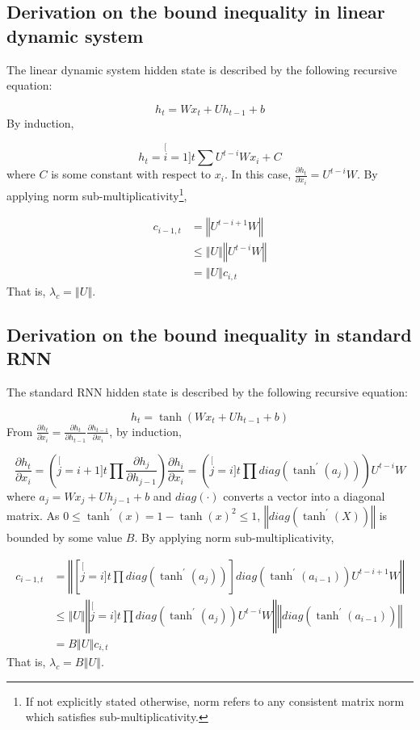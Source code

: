 
\subsection{Derivation on the bound inequality in linear dynamic system\label{subsec:Derivation-on-theRNN}}

The linear dynamic system hidden state is described by the following
recursive equation:

\[
h_{t}=Wx_{t}+Uh_{t-1}+b
\]
By induction,

\[
h_{t}=\stackrel[i=1]{t}{\sum}U^{t-i}Wx_{i}+C
\]
where $C$ is some constant with respect to $x_{i}$. In this case,
$\frac{\partial h_{t}}{\partial x_{i}}=U^{t-i}W$. By applying norm
sub-multiplicativity\footnote{If not explicitly stated otherwise, norm refers to any consistent
matrix norm which satisfies sub-multiplicativity. }, 

\begin{align*}
c_{i-1,t} & =\left\Vert U^{t-i+1}W\right\Vert \\
 & \leq\left\Vert U\right\Vert \left\Vert U^{t-i}W\right\Vert \\
 & =\left\Vert U\right\Vert c_{i,t}
\end{align*}
That is, $\lambda_{c}=\left\Vert U\right\Vert $.

\subsection{Derivation on the bound inequality in standard RNN\label{subsec:Derivation-on-theRNN-1}}

The standard RNN hidden state is described by the following recursive
equation:

\[
h_{t}=\tanh\left(Wx_{t}+Uh_{t-1}+b\right)
\]
From $\frac{\partial h_{t}}{\partial x_{i}}=\frac{\partial h_{t}}{\partial h_{t-1}}\frac{\partial h_{t-1}}{\partial x_{i}}$,
by induction, 

\[
\frac{\partial h_{t}}{\partial x_{i}}=\left(\stackrel[j=i+1]{t}{\prod}\frac{\partial h_{j}}{\partial h_{j-1}}\right)\frac{\partial h_{i}}{\partial x_{i}}=\left(\stackrel[j=i]{t}{\prod}diag\left(\tanh^{\prime}\left(a_{j}\right)\right)\right)U^{t-i}W
\]
where $a_{j}=Wx_{j}+Uh_{j-1}+b$ and $diag\left(\cdot\right)$ converts
a vector into a diagonal matrix. As $0\leq\tanh^{\prime}\left(x\right)=1-\tanh\left(x\right)^{2}\leq1$,
$\left\Vert diag\left(\tanh^{\prime}\left(X\right)\right)\right\Vert $
is bounded by some value $B$. By applying norm sub-multiplicativity, 

\begin{align*}
c_{i-1,t} & =\left\Vert \left[\stackrel[j=i]{t}{\prod}diag\left(\tanh^{\prime}\left(a_{j}\right)\right)\right]diag\left(\tanh^{\prime}\left(a_{i-1}\right)\right)U^{t-i+1}W\right\Vert \\
 & \leq\left\Vert U\right\Vert \left\Vert \stackrel[j=i]{t}{\prod}diag\left(\tanh^{\prime}\left(a_{j}\right)\right)U^{t-i}W\right\Vert \left\Vert diag\left(\tanh^{\prime}\left(a_{i-1}\right)\right)\right\Vert \\
 & =B\left\Vert U\right\Vert c_{i,t}
\end{align*}
That is, $\lambda_{c}=B\left\Vert U\right\Vert $.


